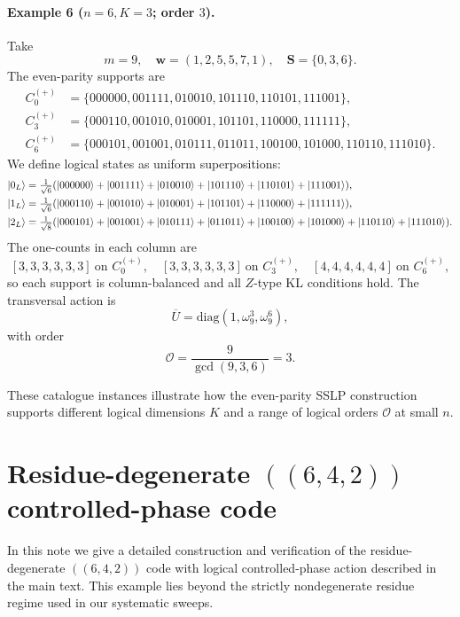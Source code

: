 \documentclass[pdflatex,sn-nature]{sn-jnl}%
\theoremstyle{thmstyleone}%
\theoremstyle{thmstyletwo}%
\theoremstyle{thmstylethree}%
\begin{document}
\begin{appendices}
\paragraph{Example 6 ($n=6,K=3$; order $3$).}
Take
\[
  m=9,\quad \mathbf w=(1,2,5,5,7,1),\quad \mathbf S=\{0,3,6\}.
\]
The even-parity supports are
\[
  \begin{aligned}
      C^{(+)}_{0} & =\{000000,001111,010010,101110,110101,111001\},               \\
      C^{(+)}_{3} & =\{000110,001010,010001,101101,110000,111111\},               \\
      C^{(+)}_{6} & =\{000101,001001,010111,011011,100100,101000,110110,111010\}.
  \end{aligned}
\]
We define logical states as uniform superpositions:
\[
  \begin{aligned}
      \ket{0_L} & =\tfrac{1}{\sqrt6}(\ket{000000}+\ket{001111}+\ket{010010}
                 +\ket{101110}+\ket{110101}+\ket{111001}),                           \\
      \ket{1_L} & =\tfrac{1}{\sqrt6}(\ket{000110}+\ket{001010}+\ket{010001}
                 +\ket{101101}+\ket{110000}+\ket{111111}),                           \\
      \ket{2_L} & =\tfrac{1}{\sqrt8}(\ket{000101}+\ket{001001}+\ket{010111}
                 +\ket{011011}+\ket{100100}+\ket{101000}+\ket{110110}+\ket{111010}).
  \end{aligned}
\]
The one-counts in each column are
\[
  [3,3,3,3,3,3]\ \text{on } C^{(+)}_{0},\quad
  [3,3,3,3,3,3]\ \text{on } C^{(+)}_{3},\quad
  [4,4,4,4,4,4]\ \text{on } C^{(+)}_{6},
\]
so each support is column-balanced and all $Z$-type KL conditions hold. The transversal action is
\[
  \overline U=\mathrm{diag}(1,\omega_9^{3},\omega_9^{6}),
\]
with order
\[
  \mathcal O=\frac{9}{\gcd(9,3,6)}=3.
\]

These catalogue instances illustrate how the even-parity SSLP construction supports different logical dimensions $K$ and a range of logical orders $\mathcal O$ at small $n$.



\section{Residue-degenerate \texorpdfstring{$((6,4,2))$}{((6,4,2))} controlled-phase code}
\label{supp:degenerate-642}

In this note we give a detailed construction and verification of the residue-degenerate $((6,4,2))$ code with logical controlled-phase action described in the main text. This example lies beyond the strictly nondegenerate residue regime used in our systematic sweeps.


\end{appendices}
\end{document}
